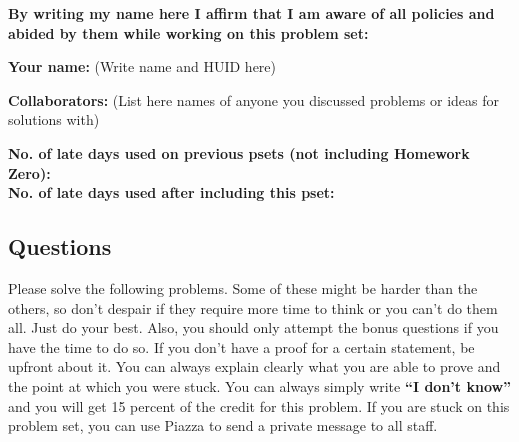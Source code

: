 \documentclass[11pt]{article}
\begin{document}
	\textbf{By writing my name here I affirm that I am aware of all policies
		and abided by them while working on this problem set:}
	
	\textbf{Your name:} (Write name and HUID here)
	
	\textbf{Collaborators:} (List here names of anyone you discussed
	problems or ideas for solutions with)
	
	\textbf{No. of late days used on previous psets (not including Homework Zero): }\\
	\textbf{No. of late days used after including this pset: }
	
	
	\newpage
	
	\subsection*{Questions}\label{questions}
	
Please solve the following problems. Some of these might be harder than
the others, so don't despair if they require more time to think or you
can't do them all. Just do your best. Also, you should only attempt the
bonus questions if you have the time to do so. If you don't have a proof
for a certain statement, be upfront about it. You can always explain
clearly what you are able to prove and the point at which you were
stuck. 
You can always simply write
\textbf{``I don't know''} and you will get 15 percent of the credit for
this problem. If you are stuck on this problem set, you can use Piazza to
send a private message to all staff.

\iffalse{ \textbf{Note on ``bonus'' questions:} There is no difference between
``bonus'' points and regular points. The indication ``bonus'' is just a
helpful hint for you: it means that the question might be harder, and
you might not want to spend inordinate amounts of time on it. Also, the
total point value of all non bonus questions will always be at least
100, so you can get a perfect grade on the problem set component of this
course without ever solving a bonus question.

\textbf{Note on reading the textbook:} If you are stuck on some of the
problems, try consulting the book to 1) understand the concepts the
question is referencing, and 2) review the way similar theorems are
proved in the book. Some helpful sections of the book for this problem
set are: Chapter 8 (for Rice's Theorem), Chapter 10 (to see solved
reductions to \(HALT\) and \(HALTONZERO\)), and Chapter 9 (for proofs
utilizing the pumping lemma and other useful proofs regarding the
computability/halting of regular expressions).

}\fi 
\end{document}

